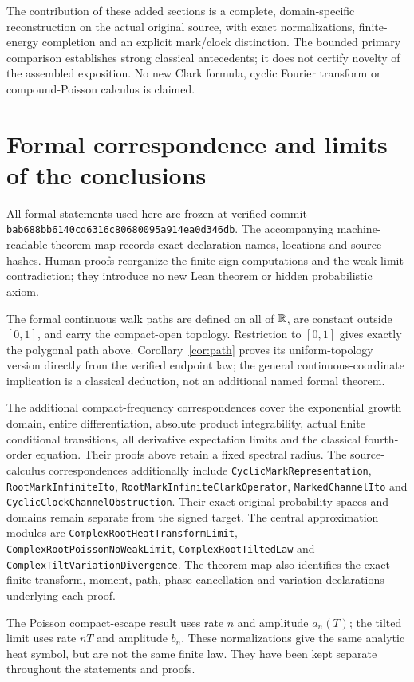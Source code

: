 \documentclass[11pt]{article}
\newcommand{\code}[1]{{\small\nolinkurl{#1}}}
\begin{document}
The contribution of these added sections is a complete, domain-specific
reconstruction on the actual original source, with exact normalizations,
finite-energy completion and an explicit mark/clock distinction.
The bounded primary comparison establishes strong classical antecedents;
it does not certify novelty of the assembled exposition. No new Clark
formula, cyclic Fourier transform or compound-Poisson calculus is claimed.

\section{Formal correspondence and limits of the conclusions}
\begingroup\raggedright
All formal statements used here are frozen at verified commit
\code{bab688bb6140cd6316c80680095a914ea0d346db}.
The accompanying machine-readable theorem map records exact declaration
names, locations and source hashes. Human proofs reorganize the finite
sign computations and the weak-limit contradiction; they introduce no
new Lean theorem or hidden probabilistic axiom.

The formal continuous walk paths are defined on all of $\mathbb R$, are constant
outside $[0,1]$, and carry the compact-open topology. Restriction to
$[0,1]$ gives exactly the polygonal path above. Corollary~\ref{cor:path}
proves its uniform-topology version directly from the verified endpoint
law; the general continuous-coordinate implication is a classical
deduction, not an additional named formal theorem.

The additional compact-frequency correspondences cover the exponential growth domain, entire differentiation, absolute product integrability, actual finite conditional transitions, all derivative expectation limits and the classical fourth-order equation. Their proofs above retain a fixed spectral radius. The source-calculus correspondences additionally include \code{CyclicMarkRepresentation}, \code{RootMarkInfiniteIto}, \code{RootMarkInfiniteClarkOperator}, \code{MarkedChannelIto} and \code{CyclicClockChannelObstruction}. Their exact original probability spaces and domains remain separate from the signed target. The central approximation modules are \code{ComplexRootHeatTransformLimit},
\code{ComplexRootPoissonNoWeakLimit}, \code{ComplexRootTiltedLaw}
and \code{ComplexTiltVariationDivergence}. The theorem map also identifies
the exact finite transform, moment, path, phase-cancellation and variation
declarations underlying each proof.

The Poisson compact-escape result uses rate $n$ and amplitude $a_n(T)$;
the tilted limit uses rate $nT$ and amplitude $b_n$. These normalizations
give the same analytic heat symbol, but are not the same finite law.
They have been kept separate throughout the statements and proofs.
\end{document}
